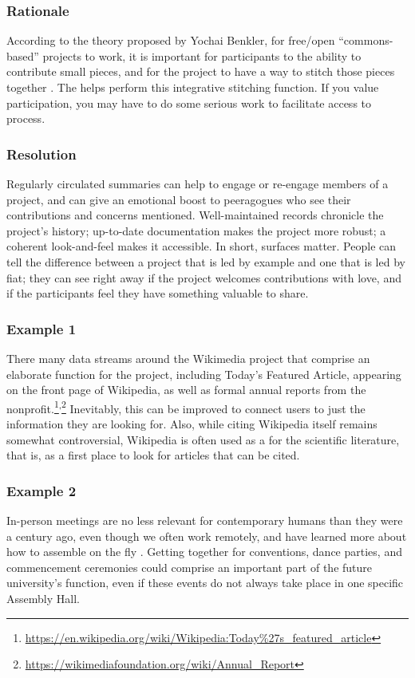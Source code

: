 \subsubsection*{Rationale}
According to the theory proposed by Yochai Benkler, for free/open ``commons-based'' projects to work, it is important for participants to the ability to contribute small pieces, and for the project to have a way to stitch those pieces together \cite{coases-penguin}.  The  helps perform this integrative stitching function.  If you value participation, you may have to do some serious work to facilitate access to process.

\subsubsection*{Resolution} 
Regularly circulated summaries can help to engage or re-engage members of a project, and can give an emotional boost to peeragogues who see their contributions and concerns mentioned.  Well-maintained records chronicle the project's history; up-to-date documentation makes the project more robust; a coherent look-and-feel makes it accessible.
%
In short, surfaces matter.  People can tell the difference between a project that is led by example and one that is led by fiat;
they can see right away if the project welcomes contributions with love, and if the participants feel they have something valuable to share.

\subsubsection*{Example 1} 
There many data streams around the Wikimedia project that comprise
an elaborate  function for the project, including
Today's Featured Article, appearing on the front page of
Wikipedia, as well as formal annual reports from the nonprofit.\footnote{\url{https://en.wikipedia.org/wiki/Wikipedia:Today\%27s_featured_article}}\textsuperscript{,}\footnote{\url{https://wikimediafoundation.org/wiki/Annual_Report}}
Inevitably, this can be improved to connect users to just the
information they are looking for.  Also, while citing Wikipedia itself
remains somewhat controversial, Wikipedia is often used as a
 for the scientific literature, that is, as a
first place to look for articles that can be cited.

\subsubsection*{Example 2} In-person meetings are no less relevant
for contemporary humans than they were a century ago, even though we
often work remotely, and have learned more about how to assemble on the fly
\cite{rheingold2007smart}.  Getting together for conventions, dance
parties, and commencement ceremonies could comprise an important part
of the future university's  function, even if
these events do not always take place in one specific Assembly Hall.

